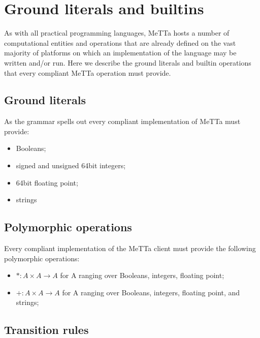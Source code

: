 \section{Ground literals and builtins}
As with all practical programming languages, MeTTa hosts a number of computational entities and operations that are already defined on the vast majority of platforms on which an implementation of the language may be written and/or run. Here we describe the ground literals and builtin operations that every compliant MeTTa operation must provide.
\subsection{Ground literals}
As the grammar spells out every compliant implementation of MeTTa must provide:

\begin{itemize}
  \item Booleans;
  \item signed and unsigned 64bit integers;
  \item 64bit floating point;
  \item strings
\end{itemize}

\subsection{Polymorphic operations}
Every compliant implementation of the MeTTa client must provide the following polymorphic operations:

\begin{itemize}
  \item $* : A \times A \rightarrow A$ for A ranging over Booleans, integers, floating point;
  \item $+ : A \times A \rightarrow A$ for A ranging over Booleans, integers, floating point, and strings;
\end{itemize}

\subsection{Transition rules}

